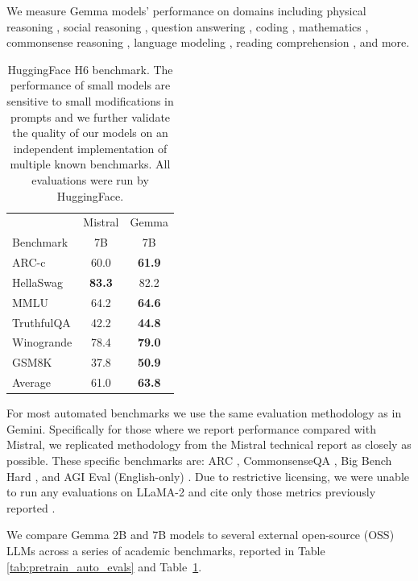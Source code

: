 \documentclass[11pt, a4paper, logo, twocolumn, copyright, nonumbering]{googledeepmind}
\begin{document}
We measure Gemma models' performance on domains including physical reasoning \citep{piqa}, social reasoning \citep{siqa}, question answering \citep{boolq,natural-questions}, coding \citep{mbpp,humaneval}, mathematics \citep{gsm8k}, commonsense reasoning \citep{winogrande}, language modeling \citep{lambada}, reading comprehension \citep{triviaqa}, and more. 

\begin{table}[ht]
    \centering
    \begin{tabular}{l c c}
    \toprule
         &  Mistral & Gemma\\
Benchmark   &  7B & 7B \\
      \midrule
ARC-c     &   60.0 & \textbf{61.9}\\
HellaSwag &   \textbf{83.3} & 82.2  \\
MMLU      &   64.2 & \textbf{64.6}\\
TruthfulQA &   42.2 & \textbf{44.8} \\
Winogrande &   78.4 &  \textbf{79.0} \\
GSM8K      &   37.8 & \textbf{50.9}   \\
\midrule
Average &  61.0 & \textbf{63.8} \\
\bottomrule
\end{tabular}
    \caption{HuggingFace H6 benchmark. 
    The performance of small models are sensitive to small modifications in prompts and we further validate the quality of our models on an independent implementation of multiple known benchmarks. All evaluations were run by HuggingFace.}
    \label{tab:pretrain_auto_evals_gemini_caption}
\end{table}

For most automated benchmarks we use the same evaluation methodology as in Gemini. Specifically for those where we report performance compared with Mistral, we replicated methodology from the Mistral technical report as closely as possible. These specific benchmarks are: ARC \citep{arc}, CommonsenseQA \citep{commonsenseqa},  Big Bench Hard \citep{bbhard}, and AGI Eval (English-only) \citep{zhong2023agieval}. Due to restrictive licensing, we were unable to run any evaluations on LLaMA-2 and cite only those metrics previously reported \citep{llama2}.


We compare Gemma 2B and 7B models to several external open-source (OSS) LLMs across a series of academic benchmarks, reported in Table \ref{tab:pretrain_auto_evals} and Table~\ref{tab:pretrain_auto_evals_gemini_caption}.
\end{document}
